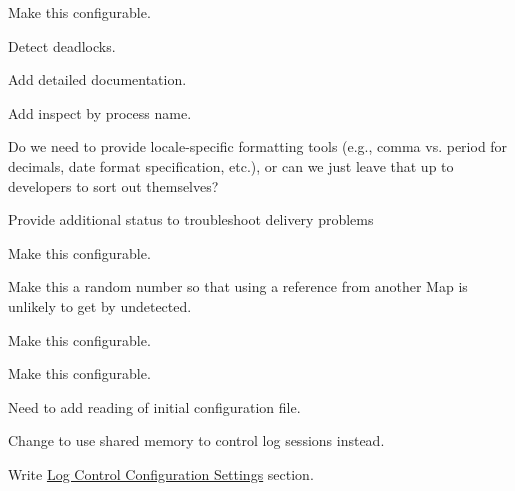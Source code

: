 \begin{DoxyRefList}
Make this configurable.  
\item[\label{todo__todo000042}%
\hypertarget{todo__todo000042}{}%
File \hyperlink{file_lock_8c}{file\+Lock.c} ]Detect deadlocks. 
\item[\label{todo__todo000062}%
\hypertarget{todo__todo000062}{}%
Page \hyperlink{c_gnss}{G\+N\+SS} ]Add detailed documentation. 
\item[\label{todo__todo000058}%
\hypertarget{todo__todo000058}{}%
File \hyperlink{inspect_8c}{inspect.c} ]Add inspect by process name. 
\item[\label{todo__todo000016}%
\hypertarget{todo__todo000016}{}%
Page \hyperlink{conceptsInternationalization}{Internationalization} ]Do we need to provide locale-\/specific formatting tools (e.\+g., comma vs. period for decimals, date format specification, etc.), or can we just leave that up to developers to sort out themselves? 
\item[\label{todo__todo000060}%
\hypertarget{todo__todo000060}{}%
Global \hyperlink{le__avdata__interface_8h_a03e16db57b2114699db0700c32e7bb78}{le\+\_\+avdata\+\_\+\+Push\+Status\+\_\+t} ]Provide additional status to troubleshoot delivery problems  
\item[\label{todo__todo000006}%
\hypertarget{todo__todo000006}{}%
Global \hyperlink{service_directory_8c_a9fb1b1c82a533eefe22075ebcb47d3c4}{le\+\_\+mem\+\_\+\+Expand\+Pool} (Client\+Connection\+Pool\+Ref, 100)]Make this configurable.  
\item[\label{todo__todo000052}%
\hypertarget{todo__todo000052}{}%
Global \hyperlink{safe_ref_8c_a85faf3c75723a1af0e1adf720d9c9dca}{le\+\_\+ref\+\_\+\+Create\+Map} (const char $\ast$name, size\+\_\+t max\+Refs)]Make this a random number so that using a reference from another Map is unlikely to get by undetected.  
\item[\label{todo__todo000043}%
\hypertarget{todo__todo000043}{}%
Global \hyperlink{log_8h_a205a0a93bd202923978f0738e1aaeac8}{log\+\_\+\+Init} (void)]Make this configurable. 

Make this configurable.  
\item[\label{todo__todo000001}%
\hypertarget{todo__todo000001}{}%
File \hyperlink{log_daemon_8c}{log\+Daemon.c} ]Need to add reading of initial configuration file. 
\item[\label{todo__todo000005}%
\hypertarget{todo__todo000005}{}%
File \hyperlink{log_daemon_8h}{log\+Daemon.h} ]Change to use shared memory to control log sessions instead. 
\item[\label{todo__todo000023}%
\hypertarget{todo__todo000023}{}%
Page \hyperlink{c_logging}{Logging A\+PI} ]Write \hyperlink{c_logging_c_log_control_config}{Log Control Configuration Settings} section.


\end{DoxyRefList}
